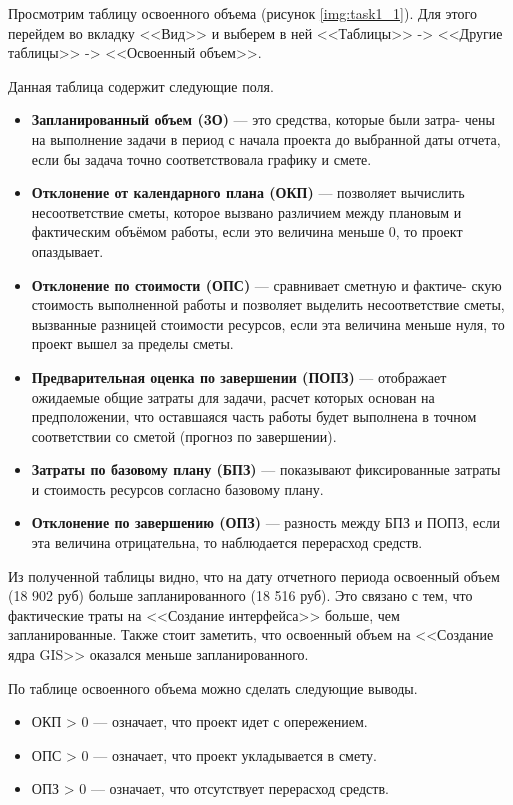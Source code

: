 \documentclass{bmstu}
\begin{document}
Просмотрим таблицу освоенного объема (рисунок \ref{img:task1_1}). Для этого перейдем во вкладку <<Вид>> и выберем в ней <<Таблицы>> -> <<Другие таблицы>> -> <<Освоенный объем>>.

Данная таблица содержит следующие поля.

\begin{itemize}
    \item \textbf{Запланированный объем (3О)} --- это средства, которые были затра- чены на выполнение задачи в период с начала проекта до выбранной даты отчета, если бы задача точно соответствовала графику и смете.
    \item \textbf{Отклонение от календарного плана (ОКП)} --- позволяет вычислить несоответствие сметы, которое вызвано различием между плановым и фактическим объёмом работы, если это величина меньше 0, то проект опаздывает.
    \item \textbf{Отклонение по стоимости (ОПС)} --- сравнивает сметную и фактиче- скую стоимость выполненной работы и позволяет выделить несоответствие сметы, вызванные разницей стоимости ресурсов, если эта величина меньше нуля, то проект вышел за пределы сметы.
    \item \textbf{Предварительная оценка по завершении (ПОПЗ)} --- отображает ожидаемые общие затраты для задачи, расчет которых основан на предположении, что оставшаяся часть работы будет выполнена в точном соответствии со сметой (прогноз по завершении).
    \item \textbf{Затраты по базовому плану (БПЗ)} --- показывают фиксированные затраты и стоимость ресурсов согласно базовому плану.
    \item \textbf{Отклонение по завершению (ОПЗ)} --- разность между БПЗ и ПОПЗ, если эта величина отрицательна, то наблюдается перерасход средств.
\end{itemize}


Из полученной таблицы видно, что на дату отчетного периода освоенный объем (18 902 руб) больше запланированного (18 516 руб). Это связано с тем, что фактические траты на <<Создание интерфейса>> больше, чем запланированные. Также стоит заметить, что освоенный объем на <<Создание ядра GIS>> оказался меньше запланированного.

По таблице освоенного объема можно сделать следующие выводы.

\begin{itemize}
    \item ОКП > 0 --- означает, что проект идет с опережением.
    \item ОПС > 0 --- означает, что проект укладывается в смету.
    \item ОПЗ > 0 --- означает, что отсутствует перерасход средств.
\end{itemize}
\end{document}
